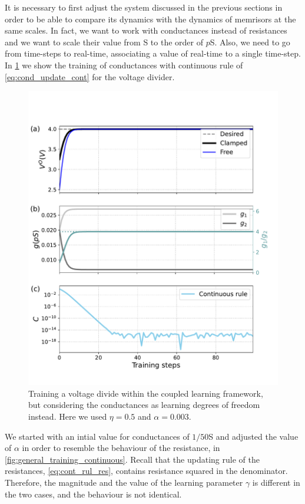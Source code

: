 \documentclass[10.5pt]{article}
\begin{document}
It is necessary to first adjust the system discussed in the previous sections in order to be able to compare its dynamics with the dynamics of memrisors at the same scales. In fact, we want to work with conductances instead of resistances and we want to scale their value from S to the order of $p$S. Also, we need to go from time-steps to real-time, associating a value of real-time to a single time-step. In \cref{fig:volt_con_mse_simp_cont} we show the training of conductances with continuous rule of \cref{eq:cond_update_cont} for the voltage divider. 
\begin{figure}[H]
    \centering
    \includegraphics[width=0.5\columnwidth]{../figures_tex/volt_con_mse_simp_cont.pdf}
    \caption{Training a voltage divide within the coupled learning framework, but considering the conductances as learning degrees of freedom instead. Here we used $\eta=0.5$ and $\alpha=0.003$.}
    \label{fig:volt_con_mse_simp_cont}
\end{figure}
We started with an intial value for conductances of $1/50$S and adjusted the value of $\alpha$ in order to resemble the behaviour of the resistance, in \cref{fig:general_training_continuous}. Recall that the updating rule of the resistances, \cref{eq:cont_rul_res}, contains resistance squared in the denominator. Therefore, the magnitude and the value of the learning parameter $\gamma$ is different in the two cases, and the behaviour is not identical.
\end{document}
